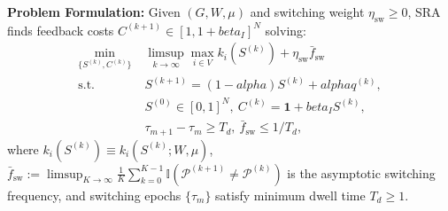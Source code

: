 \documentclass{ccjnl}
\newcommand{\rev}[1]{#1}
\def\rev#1{#1}%
\def\widetilde#1{#1}%
\def\kappa{k}%
\def\alpha{alpha}%
\def\beta{beta}%
\begin{document}
\rev{\textbf{Problem Formulation:} Given $(G, W, \mu)$ and switching weight $\eta_{\text{sw}} \ge 0$, SRA finds feedback costs $C^{(k+1)} \in [1, 1+\beta_I]^N$ solving:
\begin{equation}
    \label{eq:problem_formulation}
    \begin{aligned}
    \min_{\{S^{(k)}, C^{(k)}\}}\; & \limsup_{k \to \infty} \max_{i \in V} \widetilde{\kappa}_i(S^{(k)}) + \eta_{\text{sw}}\bar{f}_{\text{sw}} \\
    \text{s.t.}\; & S^{(k+1)} = (1-\alpha)S^{(k)} + \alpha q^{(k)}, \\
    & S^{(0)} \in [0,1]^N,\ C^{(k)} = \mathbf{1} + \beta_I S^{(k)}, \\
    & \tau_{m+1} - \tau_m \ge T_d,\ \bar{f}_{\text{sw}} \le 1/T_d,
    \end{aligned}
\end{equation}
where $\widetilde{\kappa}_i(S^{(k)}) \equiv \widetilde{\kappa}_i(S^{(k)}; W, \mu)$, $\bar{f}_{\text{sw}} := \limsup_{K\to\infty}\frac{1}{K}\sum_{k=0}^{K-1}\mathbb{I}(\mathcal{P}^{(k+1)}\neq\mathcal{P}^{(k)})$ is the asymptotic switching frequency, and switching epochs $\{\tau_m\}$ satisfy minimum dwell time $T_d \ge 1$.}
\end{document}
